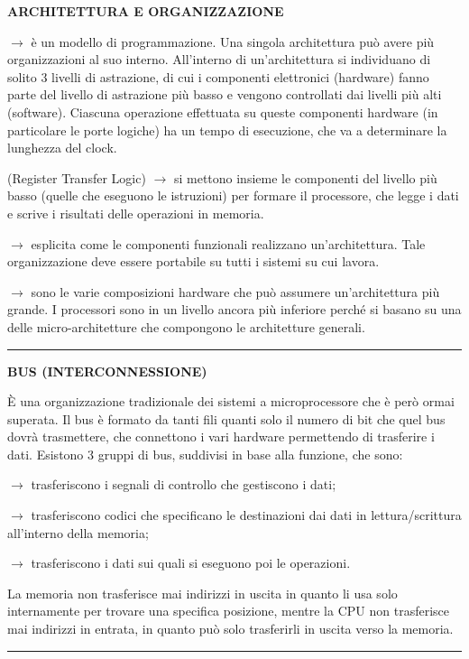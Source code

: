 \documentclass[8pt]{extarticle}
\newenvironment{formulario}
{
\setlength{\columnsep}{3em}
\twocolumn
\lstset{tabsize=3}
\begin{spacing}{1}
\begin{flushleft}
}{
\end{flushleft}
\end{spacing}
}
\newenvironment{tcenter}{
  \par
  \centering
  \setlength{\parskip}{0pt} %
  \noindent
}{
  \par
}
\newenvironment{Descr}
{
	\begin{description}[topsep=0pt,itemsep=0pt,partopsep=0pt, parsep=0pt]
}{
	\end{description}
}
\newenvironment{myParagraph}[1]
{
\begin{tcenter}
\textbf{#1}
\end{tcenter}
}{
\myRule
}
\newcommand{\myRule}{\rule{250pt}{0.1pt}}
\newcommand{\ra}{\rightarrow}
\begin{document}
\begin{formulario}
	\begin{myParagraph}{ARCHITETTURA E ORGANIZZAZIONE}
		\begin{Descr}
			\item[Architettura] $\ra$ è un modello di programmazione. Una singola architettura può avere più organizzazioni al suo interno. All'interno di un'architettura si individuano di solito 3 livelli di astrazione, di cui i componenti elettronici (hardware) fanno parte del livello di astrazione più basso e vengono controllati dai livelli più alti (software). Ciascuna operazione effettuata su queste componenti hardware (in particolare le porte logiche) ha un tempo di esecuzione, che va a determinare la lunghezza del clock. 
			\begin{Descr}
				\item[Modello RTL] (Register Transfer Logic) $\ra$ si mettono insieme le componenti del livello più basso (quelle che eseguono le istruzioni) per formare il processore, che legge i dati e scrive i risultati delle operazioni in memoria. 
			\end{Descr}
			\item[Organizzazione] $\ra$ esplicita come le componenti funzionali realizzano un'architettura. Tale organizzazione deve essere portabile su tutti i sistemi su cui lavora. 
			\begin{Descr}
				\item[Micro-Architettura] $\ra$ sono le varie composizioni hardware che può assumere un'architettura più grande. I processori sono in un livello ancora più inferiore perché si basano su una delle micro-architetture che compongono le architetture generali. 
			\end{Descr}
		\end{Descr}
	\end{myParagraph}
	
	\begin{myParagraph}{BUS (INTERCONNESSIONE)}
È una organizzazione tradizionale dei sistemi a microprocessore che è però ormai superata. Il bus è formato da tanti fili quanti solo il numero di bit che quel bus dovrà trasmettere, che connettono i vari hardware permettendo di trasferire i dati. Esistono 3 gruppi di bus, suddivisi in base alla funzione, che sono:
		\begin{Descr}
			\item[Bus dei Controlli] $\ra$ trasferiscono i segnali di controllo che gestiscono i dati;
			\item[Bus degli Indirizzi] $\ra$ trasferiscono codici che specificano le destinazioni dai dati in lettura/scrittura all'interno della memoria;
			\item[Bus dei Dati] $\ra$ trasferiscono i dati sui quali si eseguono poi le operazioni.
		\end{Descr}
La memoria non trasferisce mai indirizzi in uscita in quanto li usa solo internamente per trovare una specifica posizione, mentre la CPU non trasferisce mai indirizzi in entrata, in quanto può solo trasferirli in uscita verso la memoria.
	\end{myParagraph}


\end{formulario}
\end{document}
